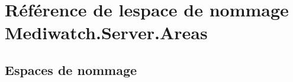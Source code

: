 \hypertarget{namespace_mediwatch_1_1_server_1_1_areas}{}\section{Référence de l\textquotesingle{}espace de nommage Mediwatch.\+Server.\+Areas}
\label{namespace_mediwatch_1_1_server_1_1_areas}
\subsection*{Espaces de nommage}
\begin{DoxyCompactItemize}
\end{DoxyCompactItemize}
